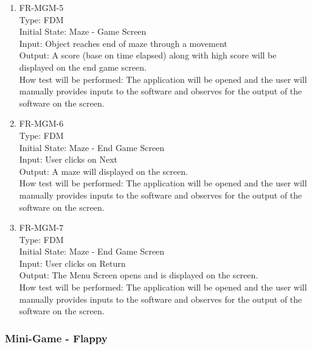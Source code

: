 \documentclass[12pt, titlepage]{article}
\begin{document}
\begin{enumerate}
\item{FR-MGM-5\\}
Type: FDM\\
Initial State: Maze - Game Screen\\
Input: Object reaches end of maze through a movement\\
Output: A score (base on time elapsed) along with high score will be displayed on the end game screen.\\
How test will be performed: The application will be opened and the user will manually provides inputs to the software and observes for the output of the software on the screen.\\

\item{FR-MGM-6\\}
Type: FDM\\
Initial State: Maze - End Game Screen\\
Input: User clicks on Next\\
Output: A maze will displayed on the screen.\\
How test will be performed: The application will be opened and the user will manually provides inputs to the software and observes for the output of the software on the screen.\\

\item{FR-MGM-7\\}
Type: FDM\\
Initial State: Maze - End Game Screen\\
Input: User clicks on Return\\
Output: The Menu Screen opens and is displayed on the screen.\\
How test will be performed: The application will be opened and the user will manually provides inputs to the software and observes for the output of the software on the screen.\\
    
\end{enumerate}

\subsubsection{Mini-Game - Flappy}
\end{document}
